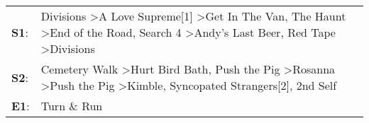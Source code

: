 \begin{supertabular}{p{0.03\textwidth}p{0.92\textwidth}}
 \textbf{S1}:  &  Divisions\textsuperscript{} \textgreater \enspace A Love Supreme[1]\textsuperscript{} \textgreater \enspace Get In The Van\textsuperscript{}, \enspace The Haunt\textsuperscript{} \textgreater \enspace End of the Road\textsuperscript{}, \enspace Search 4\textsuperscript{} \textgreater \enspace Andy's Last Beer\textsuperscript{}, \enspace Red Tape\textsuperscript{} \textgreater \enspace Divisions\textsuperscript{}  \enspace  \\
 \textbf{S2}:  &                                                     Cemetery Walk\textsuperscript{} \textgreater \enspace Hurt Bird Bath\textsuperscript{}, \enspace Push the Pig\textsuperscript{} \textgreater \enspace Rosanna\textsuperscript{} \textgreater \enspace Push the Pig\textsuperscript{} \textgreater \enspace Kimble\textsuperscript{}, \enspace Syncopated Strangers[2]\textsuperscript{}, \enspace 2nd Self\textsuperscript{}  \enspace  \\
 \textbf{E1}:  &                                                                                                                                                                                                                                                                                                                                                                                                    Turn \& Run\textsuperscript{}  \enspace  \\
\end{supertabular}
